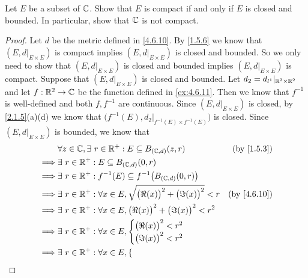 \begin{ex}\label{ex:4.6.13}
  Let \(E\) be a subset of \(\mathbb{C}\).
  Show that \(E\) is compact if and only if \(E\) is closed and bounded.
  In particular, show that \(\mathbb{C}\) is not compact.
\end{ex}

\begin{proof}
  Let \(d\) be the metric defined in \cref{4.6.10}.
  By \cref{1.5.6} we know that \((E, d|_{E \times E})\) is compact implies \((E, d|_{E \times E})\) is closed and bounded.
  So we only need to show that \((E, d|_{E \times E})\) is closed and bounded implies \((E, d|_{E \times E})\) is compact.
  Suppose that \((E, d|_{E \times E})\) is closed and bounded.
  Let \(d_2 = d_{l^1}|_{\mathbb{R}^2 \times \mathbb{R}^2}\) and let \(f : \mathbb{R}^2 \to \mathbb{C}\) be the function defined in \cref{ex:4.6.11}.
  Then we know that \(f^{-1}\) is well-defined and both \(f, f^{-1}\) are continuous.
  Since \((E, d|_{E \times E})\) is closed, by \cref{2.1.5}(a)(d) we know that \(\big(f^{-1}(E), d_2|_{f^{-1}(E) \times f^{-1}(E)}\big)\) is closed.
  Since \((E, d|_{E \times E})\) is bounded, we know that
  \begin{align*}
             & \forall z \in \C, \exists\ r \in \R^+ : E \subseteq B_{(\C, d)}(z, r)                     & \text{(by \cref{1.5.3})}  \\
    \implies & \exists\ r \in \R^+ : E \subseteq B_{(\C, d)}(0, r)                                                                   \\
    \implies & \exists\ r \in \R^+ : f^{-1}(E) \subseteq f^{-1}\big(B_{(\C, d)}(0, r)\big)                                           \\
    \implies & \exists\ r \in \R^+ : \forall x \in E, \sqrt{\big(\Re(x)\big)^2 + \big(\Im(x)\big)^2} < r & \text{(by \cref{4.6.10})} \\
    \implies & \exists\ r \in \R^+ : \forall x \in E, \big(\Re(x)\big)^2 + \big(\Im(x)\big)^2 < r^2                                  \\
    \implies & \exists\ r \in \R^+ : \forall x \in E, \begin{cases}
                                                        \big(\Re(x)\big)^2 < r^2 \\
                                                        \big(\Im(x)\big)^2 < r^2
                                                      \end{cases}                                                       \\
    \implies & \exists\ r \in \R^+ : \forall x \in E, \begin{cases}

\end{cases}
\end{align*}
\end{proof}
